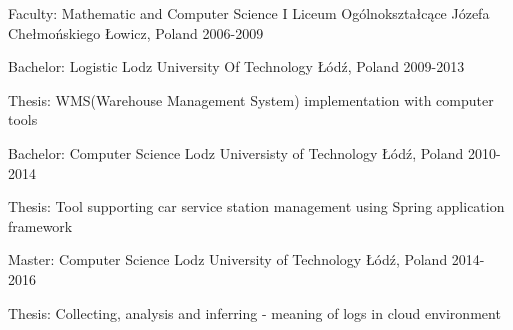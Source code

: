 
\begin{cventries}

  \cventry
    {Faculty: Mathematic and Computer Science}
    {I Liceum Ogólnokształcące Józefa Chełmońskiego}
    {Łowicz, Poland}
    {2006-2009}
    {}

  \cventry
    {Bachelor: Logistic}
    {Lodz University Of Technology}
    {Łódź, Poland}
    {2009-2013}
    {
      \begin{cvitems}
        \item{Thesis: WMS(Warehouse Management System) implementation with computer tools}
      \end{cvitems}
    }

  \cventry
    {Bachelor: Computer Science}
    {Lodz Universisty of Technology}
    {Łódź, Poland}
    {2010-2014}
    {
      \begin{cvitems}
        \item{Thesis: Tool supporting car service station management using Spring application framework}
      \end{cvitems}
    }

  \cventry
    {Master: Computer Science}
    {Lodz University of Technology}
    {Łódź, Poland}
    {2014-2016}
    {
      \begin{cvitems}
        \item{Thesis: Collecting, analysis and inferring - meaning of logs in cloud environment}
      \end{cvitems}
    }

\end{cventries}
